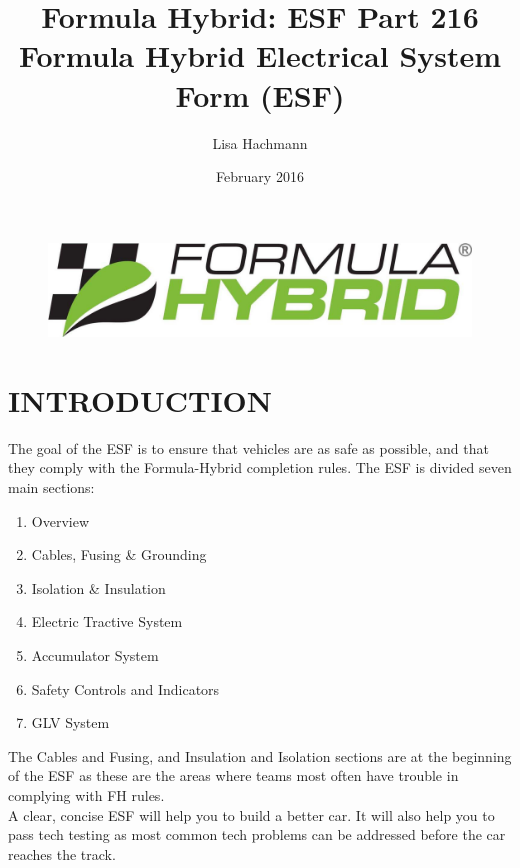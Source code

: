 \documentclass{article}
\title{Formula Hybrid: ESF Part 2}
\author{Lisa Hachmann}
\date{February 2016}
\begin{document}
\pagestyle{fancy}
\renewcommand{\headrulewidth}{0pt}
\lhead{}
\chead{}
\rhead{}
\cfoot{} %

\newpage

\begin{figure}[H]
    \centering
    \includegraphics[width = 0.7 \textwidth]{FHlogo}
\end{figure}

\vfill

\title{16 Formula Hybrid Electrical System Form (ESF)}

\section*{INTRODUCTION}
    The goal of the ESF is to ensure that vehicles are as safe as possible, and that they comply with the Formula-Hybrid completion rules. The ESF is divided seven main sections:

    \begin{enumerate}
        \item Overview
        \item Cables, Fusing \& Grounding \item Isolation \& Insulation
        \item Electric Tractive System
        \item Accumulator System
        \item Safety Controls and Indicators
        \item GLV System
    \end{enumerate}

    The Cables and Fusing, and Insulation and Isolation sections are at the beginning of the ESF as these are the areas where teams most often have trouble in complying with FH rules.\\

    A clear, concise ESF will help you to build a better car. It will also help you to pass tech testing as most common tech problems can be addressed before the car reaches the track.\\
\end{document}
